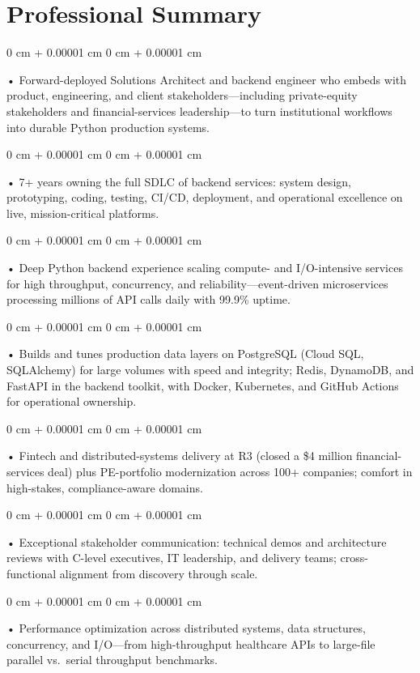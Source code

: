 \documentclass[10pt, letterpaper]{article}
\newenvironment{onecolentry}{
    \begin{adjustwidth}{
        0 cm + 0.00001 cm
    }{
        0 cm + 0.00001 cm
    }
}{
    \end{adjustwidth}
} %
\begin{document}
    \section{Professional Summary}
        \vspace{2 pt }
        \begin{onecolentry}
            • Forward-deployed Solutions Architect and backend engineer who embeds with product, engineering, and client stakeholders---including private-equity stakeholders and financial-services leadership---to turn institutional workflows into durable Python production systems.
        \end{onecolentry}
        \begin{onecolentry}
            • 7+ years owning the full SDLC of backend services: system design, prototyping, coding, testing, CI/CD, deployment, and operational excellence on live, mission-critical platforms.
        \end{onecolentry}
        \begin{onecolentry}
            • Deep Python backend experience scaling compute- and I/O-intensive services for high throughput, concurrency, and reliability---event-driven microservices processing millions of API calls daily with 99.9\% uptime.
        \end{onecolentry}
        \begin{onecolentry}
            • Builds and tunes production data layers on PostgreSQL (Cloud SQL, SQLAlchemy) for large volumes with speed and integrity; Redis, DynamoDB, and FastAPI in the backend toolkit, with Docker, Kubernetes, and GitHub Actions for operational ownership.
        \end{onecolentry}
        \begin{onecolentry}
            • Fintech and distributed-systems delivery at R3 (closed a \$4 million financial-services deal) plus PE-portfolio modernization across 100+ companies; comfort in high-stakes, compliance-aware domains.
        \end{onecolentry}
        \begin{onecolentry}
            • Exceptional stakeholder communication: technical demos and architecture reviews with C-level executives, IT leadership, and delivery teams; cross-functional alignment from discovery through scale.
        \end{onecolentry}
        \begin{onecolentry}
            • Performance optimization across distributed systems, data structures, concurrency, and I/O---from high-throughput healthcare APIs to large-file parallel vs.\ serial throughput benchmarks.
        \end{onecolentry}
\end{document}
